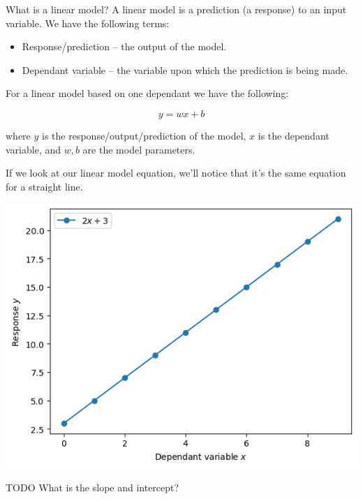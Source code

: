 \documentclass[10pt]{beamer}
\begin{document}
\begin{frame}[fragile,allowframebreaks,label=]{What is a linear model?}
A linear model is a prediction (a response) to an input variable. We have the
following terms:

\begin{itemize}
\item Response/prediction -- the output of the model.
\item Dependant variable -- the variable upon which the prediction is being made.
\end{itemize}

For a linear model based on one dependant we have the following:

\[
y = w x + b
\]

where \(y\) is the response/output/prediction of the model, \(x\) is the dependant
variable, and \(w, b\) are the model parameters.

If we look at our linear model equation, we'll notice that it's the same equation for a straight line.

\begin{center}
\includegraphics[width=.9\linewidth]{images/linear_model.png}
\end{center}

\alert{TODO} What is the slope and intercept?
\end{frame}
\end{document}
